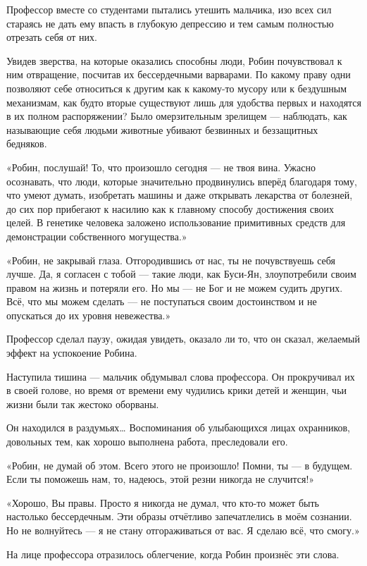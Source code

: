 \documentclass[a5paper, 9pt,
final, openany, twoside=true]{memoir}
\begin{document}
Профессор вместе со студентами пытались утешить мальчика, изо всех сил стараясь не дать ему впасть в глубокую депрессию и тем самым полностью отрезать себя от них.

Увидев зверства, на которые оказались способны люди, Робин почувствовал к ним отвращение, посчитав их бессердечными варварами. По какому праву одни позволяют себе относиться к другим как к какому-то мусору или к бездушным механизмам, как будто вторые существуют лишь для удобства первых и находятся в их полном распоряжении? Было омерзительным зрелищем — наблюдать, как называющие себя людьми животные убивают 
безвинных и беззащитных бедняков.\bigskip

«Робин, послушай! То, что произошло сегодня — не твоя вина. Ужасно осознавать, что люди, которые значительно продвинулись вперёд благодаря тому, что умеют думать, изобретать машины и даже открывать лекарства от болезней, до сих пор прибегают к насилию как к главному способу достижения своих целей. В генетике человека заложено использование примитивных средств для демонстрации собственного могущества.»

«Робин, не закрывай глаза. Отгородившись от нас, ты не почувствуешь себя лучше. Да, я согласен с тобой — такие люди, как Буси-Ян, злоупотребили своим правом на жизнь и потеряли его. Но мы — не Бог и не можем судить других. Всё, что мы можем сделать — не поступаться своим достоинством и не опускаться до их уровня невежества.»

Профессор сделал паузу, ожидая увидеть, оказало ли то, что он сказал, желаемый эффект на успокоение Робина.

Наступила тишина — мальчик обдумывал слова профессора. Он прокручивал их в своей голове, но время от времени ему чудились крики детей и женщин, чьи жизни были так жестоко оборваны.

Он находился в раздумьях… Воспоминания об улыбающихся лицах охранников, довольных тем, как хорошо выполнена работа, преследовали его.

«Робин, не думай об этом. Всего этого не произошло! Помни, ты — в будущем. Если ты поможешь нам, то, надеюсь, этой резни никогда не случится!»

«Хорошо, Вы правы. Просто я никогда не думал, что кто-то может быть настолько бессердечным. Эти образы отчётливо запечатлелись в моём сознании. Но не волнуйтесь — я не стану отгораживаться от вас. Я сделаю всё, что смогу.»

На лице профессора отразилось облегчение, когда Робин произнёс эти слова.
\end{document}
